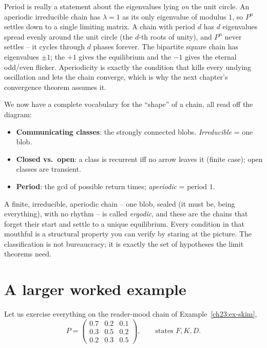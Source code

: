 \begin{happeningbox}
Period is really a statement about the eigenvalues lying \emph{on} the unit circle. An
aperiodic irreducible chain has $\lambda = 1$ as its only eigenvalue of modulus $1$, so
$P^n$ settles down to a single limiting matrix. A chain with period $d$ has $d$ eigenvalues
spread evenly around the unit circle (the $d$-th roots of unity), and $P^n$ never settles --
it cycles through $d$ phases forever. The bipartite square chain has eigenvalues $\pm 1$; the
$+1$ gives the equilibrium and the $-1$ gives the eternal odd/even flicker. Aperiodicity is
exactly the condition that kills every undying oscillation and lets the chain converge, which
is why the next chapter's convergence theorem assumes it.
\end{happeningbox}

\begin{aestheticbox}
We now have a complete vocabulary for the ``shape'' of a chain, all read off the diagram:
\begin{itemize}
  \item \textbf{Communicating classes}: the strongly connected blobs. \emph{Irreducible} = one
    blob.
  \item \textbf{Closed vs.\ open}: a class is recurrent iff no arrow leaves it (finite case);
    open classes are transient.
  \item \textbf{Period}: the gcd of possible return times; \emph{aperiodic} = period $1$.
\end{itemize}
A finite, irreducible, aperiodic chain -- one blob, sealed (it must be, being everything),
with no rhythm -- is called \emph{ergodic}, and these are the chains that forget their start
and settle to a unique equilibrium. Every condition in that mouthful is a structural property
you can verify by staring at the picture. The classification is not bureaucracy; it is exactly
the set of hypotheses the limit theorems need.
\end{aestheticbox}

\section{A larger worked example}
\label{ch23:worked-example}

Let us exercise everything on the reader-mood chain of Example~\ref{ch23:ex-skim},
\[
  P = \begin{pmatrix}
   0.7 & 0.2 & 0.1 \\
   0.3 & 0.5 & 0.2 \\
   0.2 & 0.3 & 0.5
  \end{pmatrix},
  \qquad \text{states } F, K, D.
\]

